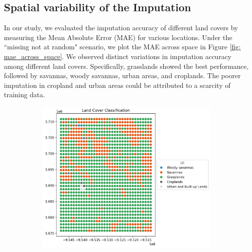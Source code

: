 \documentclass[review]{elsarticle}
\begin{document}
\subsection{Spatial variability of the Imputation}
In our study, we evaluated the imputation accuracy of different land covers by measuring the Mean Absolute Error (MAE) for various locations. Under the ``missing not at random" scenario, we plot the MAE across space in Figure \ref{fig: mae_across_space}. We observed distinct variations in imputation accuracy among different land covers. Specifically, grasslands showed the best performance, followed by savannas, woody savannas, urban areas, and croplands. The poorer imputation in cropland and urban areas could be attributed to a scarcity of training data.


\begin{figure}
     \centering
      \begin{subfigure}[b]{0.45\textwidth}
		\centering
		\includegraphics[width=\textwidth]{figure/eda_static}
		\caption{}
		\label{fig: missing at time points	}
	 \end{subfigure}
         \hfill
      \begin{subfigure}[b]{0.4\textwidth}

\end{subfigure}
\end{figure}
\end{document}
